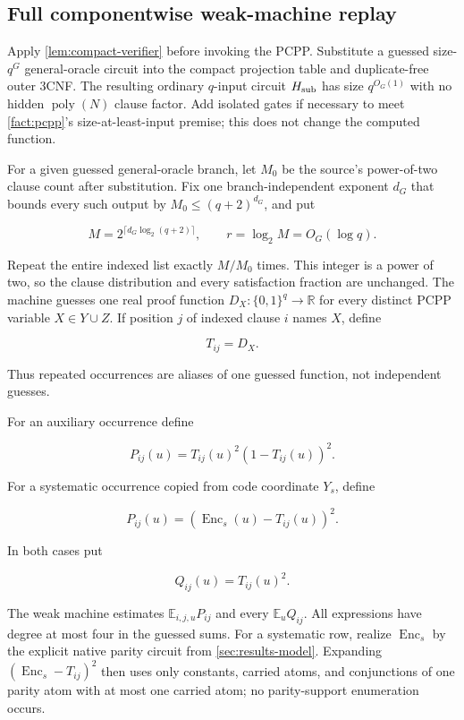 \documentclass[11pt,letterpaper]{article}
\newcommand{\cref}[1]{\ref{#1}}
\theoremstyle{definition}
\theoremstyle{remark}
\begin{document}
\subsection{Full componentwise weak-machine
replay}\label{c10-full-componentwise-weak-machine-replay}

Apply \cref{lem:compact-verifier} before invoking the PCPP. Substitute a guessed
size-\(q^G\) general-oracle circuit into the compact projection table
and duplicate-free outer 3CNF. The resulting ordinary \(q\)-input
circuit \(H_{\rm sub}\) has size \(q^{O_G(1)}\) with no hidden
\(\operatorname{poly}(N)\) clause factor. Add isolated gates if
necessary to meet \cref{fact:pcpp}'s size-at-least-input
premise; this does not change the computed function.

For a given guessed general-oracle branch, let \(M_0\) be the
source's power-of-two clause count after substitution.
Fix one branch-independent exponent \(d_G\) that bounds every such
output by \(M_0\le(q+2)^{d_G}\), and put

\[
M
{}={}
2^{\lceil d_G\log_2(q+2)\rceil},
\qquad
r=\log_2M=O_G(\log q).
\]

Repeat the entire indexed list exactly \(M/M_0\) times. This integer is
a power of two, so the clause distribution and every satisfaction
fraction are unchanged. The machine guesses one real proof function
\(D_X:\{0,1\}^q\to\mathbb R\) for every distinct PCPP variable
\(X\in Y\cup Z\). If position \(j\) of indexed clause \(i\) names \(X\),
define

\[
T_{ij}=D_X.
\]

Thus repeated occurrences are aliases of one guessed function, not
independent guesses.

For an auxiliary occurrence define

\[
P_{ij}(u)
{}={}
T_{ij}(u)^2(1-T_{ij}(u))^2.
\]

For a systematic occurrence copied from code coordinate \(Y_s\), define

\[
P_{ij}(u)
{}={}
(\operatorname{Enc}_s(u)-T_{ij}(u))^2.
\]

In both cases put

\[
Q_{ij}(u)=T_{ij}(u)^2.
\]

The weak machine estimates \(\mathbb E_{i,j,u}P_{ij}\) and every
\(\mathbb E_uQ_{ij}\). All expressions have degree at most four in the
guessed sums. For a systematic row, realize \(\operatorname{Enc}_s\) by
the explicit native parity circuit from \cref{sec:results-model}. Expanding
\((\operatorname{Enc}_s-T_{ij})^2\) then uses only constants, carried
atoms, and conjunctions of one parity atom with at most one carried
atom; no parity-support enumeration occurs.
\end{document}
